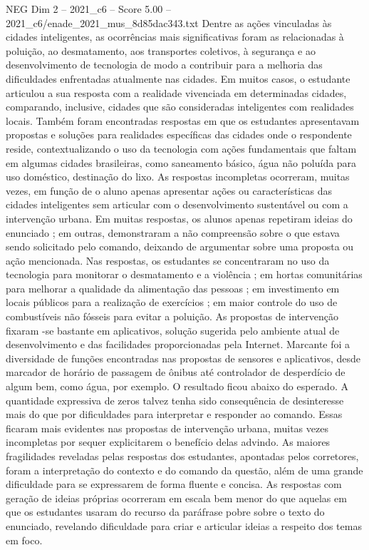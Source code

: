\begin{textsample}{NEG Dim 2 – 2021\_c6 – Score 5.00 – 2021\_c6/enade\_2021\_mus\_8d85dac343.txt}
Dentre as ações vinculadas às cidades inteligentes, as ocorrências mais significativas foram as relacionadas à poluição, ao desmatamento, aos transportes coletivos, à segurança e ao desenvolvimento de tecnologia de modo a contribuir para a melhoria das dificuldades enfrentadas atualmente nas cidades.
Em muitos casos, o estudante articulou a sua resposta com a realidade vivenciada em determinadas cidades, comparando, inclusive, cidades que são consideradas inteligentes com realidades locais.
Também foram encontradas respostas em que os estudantes apresentavam propostas e soluções para realidades específicas das cidades onde o respondente reside, contextualizando o uso da tecnologia com ações fundamentais que faltam em algumas cidades brasileiras, como saneamento básico, água não poluída para uso doméstico, destinação do lixo.
As respostas incompletas ocorreram, muitas vezes, em função de o aluno apenas apresentar ações ou características das cidades inteligentes sem articular com o desenvolvimento sustentável ou com a intervenção urbana.
Em muitas respostas, os alunos apenas repetiram ideias do enunciado ; em outras, demonstraram a não compreensão sobre o que estava sendo solicitado pelo comando, deixando de argumentar sobre uma proposta ou ação mencionada.
Nas respostas, os estudantes se concentraram no uso da tecnologia para monitorar o desmatamento e a violência ; em hortas comunitárias para melhorar a qualidade da alimentação das pessoas ; em investimento em locais públicos para a realização de exercícios ; em maior controle do uso de combustíveis não fósseis para evitar a poluição.
As propostas de intervenção fixaram -se bastante em aplicativos, solução sugerida pelo ambiente atual de desenvolvimento e das facilidades proporcionadas pela Internet.
Marcante foi a diversidade de funções encontradas nas propostas de sensores e aplicativos, desde marcador de horário de passagem de ônibus até controlador de desperdício de algum bem, como água, por exemplo.
O resultado ficou abaixo do esperado.
A quantidade expressiva de zeros talvez tenha sido consequência de desinteresse mais do que por dificuldades para interpretar e responder ao comando.
Essas ficaram mais evidentes nas propostas de intervenção urbana, muitas vezes incompletas por sequer explicitarem o benefício delas advindo.
As maiores fragilidades reveladas pelas respostas dos estudantes, apontadas pelos corretores, foram a interpretação do contexto e do comando da questão, além de uma grande dificuldade para se expressarem de forma fluente e concisa.
As respostas com geração de ideias próprias ocorreram em escala bem menor do que aquelas em que os estudantes usaram do recurso da paráfrase pobre sobre o texto do enunciado, revelando dificuldade para criar e articular ideias a respeito dos temas em foco.

\end{textsample}
